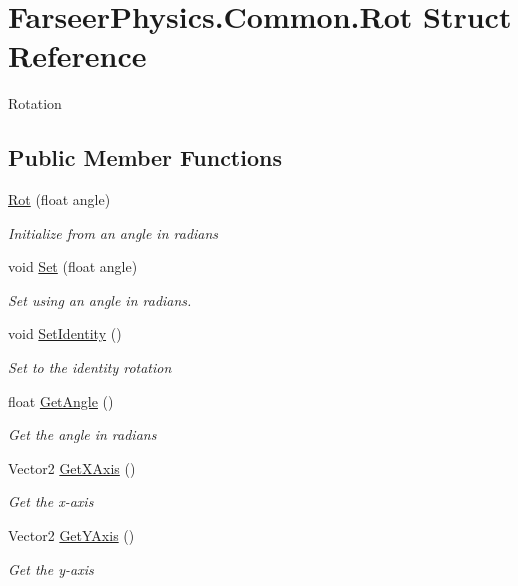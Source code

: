 \hypertarget{struct_farseer_physics_1_1_common_1_1_rot}{\section{Farseer\+Physics.\+Common.\+Rot Struct Reference}
\label{struct_farseer_physics_1_1_common_1_1_rot}
}


Rotation  


\subsection*{Public Member Functions}
\begin{DoxyCompactItemize}
\item 
\hyperlink{struct_farseer_physics_1_1_common_1_1_rot_ac2710c3e3fbd38a50e9185b8ac7919ab}{Rot} (float angle)
\begin{DoxyCompactList}\small\item\em Initialize from an angle in radians \end{DoxyCompactList}\item 
void \hyperlink{struct_farseer_physics_1_1_common_1_1_rot_afd277544c89ebe0ac8dc19a869c874fa}{Set} (float angle)
\begin{DoxyCompactList}\small\item\em Set using an angle in radians. \end{DoxyCompactList}\item 
void \hyperlink{struct_farseer_physics_1_1_common_1_1_rot_a40b6f96f757a813d37f32d9dcd2e5bfe}{Set\+Identity} ()
\begin{DoxyCompactList}\small\item\em Set to the identity rotation \end{DoxyCompactList}\item 
float \hyperlink{struct_farseer_physics_1_1_common_1_1_rot_adfb563387d18995e0b77c361262c760a}{Get\+Angle} ()
\begin{DoxyCompactList}\small\item\em Get the angle in radians \end{DoxyCompactList}\item 
Vector2 \hyperlink{struct_farseer_physics_1_1_common_1_1_rot_a99dfe528ec58ecf5992d0f52ff603f84}{Get\+X\+Axis} ()
\begin{DoxyCompactList}\small\item\em Get the x-\/axis \end{DoxyCompactList}\item 
Vector2 \hyperlink{struct_farseer_physics_1_1_common_1_1_rot_af2ff61ac47c85f1c38cee819b1af846a}{Get\+Y\+Axis} ()
\begin{DoxyCompactList}\small\item\em Get the y-\/axis \end{DoxyCompactList}\end{DoxyCompactItemize}
